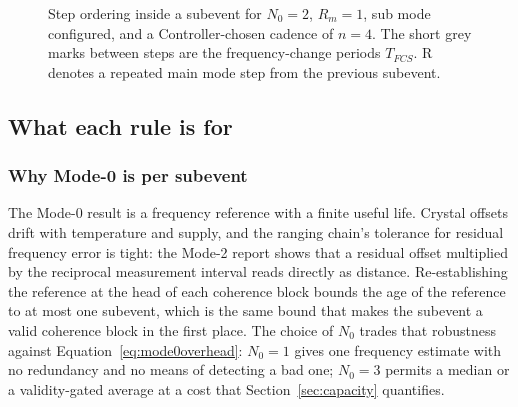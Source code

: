 \documentclass[11pt,a4paper]{article}
\newcommand{\Tfcs}{T_{FCS}}
\newcommand{\Tse}{T_{SE}}
\begin{document}
\begin{figure}[h]
\centering
{}
\vspace{4mm}
\caption{Step ordering inside a subevent for $N_0 = 2$, $R_m = 1$, sub mode configured, and a
Controller-chosen cadence of $n = 4$. The short grey marks between steps are the frequency-change
periods $\Tfcs$. R denotes a repeated main mode step from the previous subevent.}
\label{fig:ordering}
\end{figure}

\subsection{What each rule is for}

\subsubsection{Why Mode-0 is per subevent}

The Mode-0 result is a frequency reference with a finite useful life. Crystal offsets drift with
temperature and supply, and the ranging chain's tolerance for residual frequency error is tight: the
Mode-2 report shows that a residual offset multiplied by the reciprocal measurement interval reads
directly as distance. Re-establishing the reference at the head of each coherence block bounds the
age of the reference to at most one subevent, which is the same bound that makes the subevent a valid
coherence block in the first place. The choice of $N_0$ trades that robustness against
Equation~\eqref{eq:mode0overhead}: $N_0 = 1$ gives one frequency estimate with no redundancy and no
means of detecting a bad one; $N_0 = 3$ permits a median or a validity-gated average at a cost that
Section~\ref{sec:capacity} quantifies.
\end{document}

